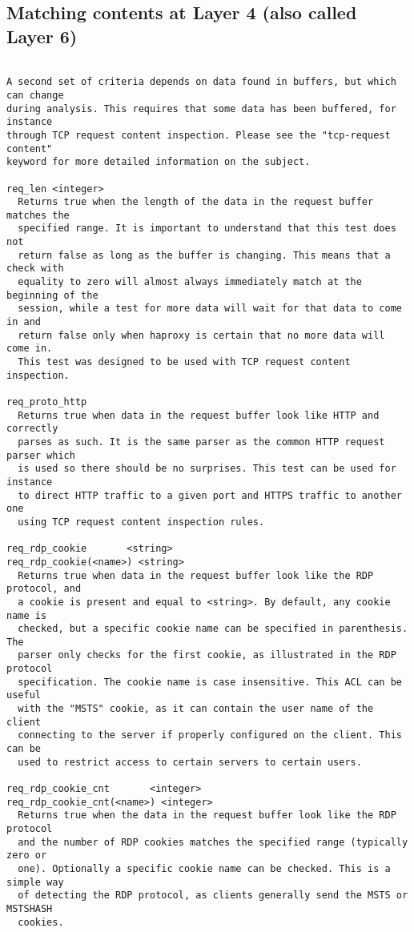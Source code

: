 
\subsection{Matching contents at Layer 4 (also called Layer 6)}

\begin{verbatim}

A second set of criteria depends on data found in buffers, but which can change
during analysis. This requires that some data has been buffered, for instance
through TCP request content inspection. Please see the "tcp-request content"
keyword for more detailed information on the subject.

req_len <integer>
  Returns true when the length of the data in the request buffer matches the
  specified range. It is important to understand that this test does not
  return false as long as the buffer is changing. This means that a check with
  equality to zero will almost always immediately match at the beginning of the
  session, while a test for more data will wait for that data to come in and
  return false only when haproxy is certain that no more data will come in.
  This test was designed to be used with TCP request content inspection.

req_proto_http
  Returns true when data in the request buffer look like HTTP and correctly
  parses as such. It is the same parser as the common HTTP request parser which
  is used so there should be no surprises. This test can be used for instance
  to direct HTTP traffic to a given port and HTTPS traffic to another one
  using TCP request content inspection rules.

req_rdp_cookie       <string>
req_rdp_cookie(<name>) <string>
  Returns true when data in the request buffer look like the RDP protocol, and
  a cookie is present and equal to <string>. By default, any cookie name is
  checked, but a specific cookie name can be specified in parenthesis. The
  parser only checks for the first cookie, as illustrated in the RDP protocol
  specification. The cookie name is case insensitive. This ACL can be useful
  with the "MSTS" cookie, as it can contain the user name of the client
  connecting to the server if properly configured on the client. This can be
  used to restrict access to certain servers to certain users.

req_rdp_cookie_cnt       <integer>
req_rdp_cookie_cnt(<name>) <integer>
  Returns true when the data in the request buffer look like the RDP protocol
  and the number of RDP cookies matches the specified range (typically zero or
  one). Optionally a specific cookie name can be checked. This is a simple way
  of detecting the RDP protocol, as clients generally send the MSTS or MSTSHASH
  cookies.


\end{verbatim}
